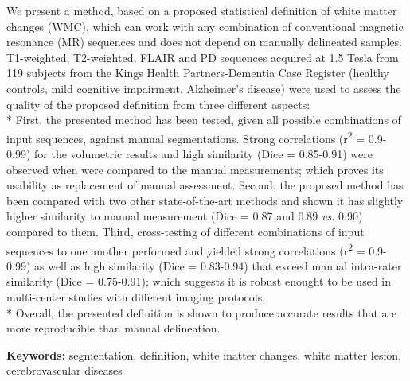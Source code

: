 We present a method, based on a proposed statistical definition of white matter changes (WMC), which can work with any combination of conventional magnetic resonance (MR) sequences and does not depend on manually delineated samples. T1-weighted, T2-weighted, FLAIR and PD sequences acquired at 1.5 Tesla from 119 subjects from the Kings Health Partners-Dementia Case Register (healthy controls, mild cognitive impairment, Alzheimer’s disease) were used to assess the quality of the proposed definition from three different aspects:
\\*
First, the presented method has been tested, given all possible combinations of input sequences, against manual segmentations. Strong correlations (r\textsuperscript{2} = 0.9-0.99) for the volumetric results and high similarity (Dice = 0.85-0.91) were observed when were compared to the manual measurements; which proves its usability as replacement of manual assessment.
Second, the proposed method has been compared with two other state-of-the-art methods and shown it has slightly higher similarity to manual measurement (Dice = 0.87 and 0.89 \textit{vs.} 0.90) compared to them.
Third, cross-testing of different combinations of input sequences to one another performed and yielded strong correlations (r\textsuperscript{2} = 0.9-0.99) as well as high similarity (Dice = 0.83-0.94) that exceed manual intra-rater similarity (Dice = 0.75-0.91); which suggests it is robust enought to be used in multi-center studies with different imaging protocols.
\\*
Overall, the presented definition is shown to produce accurate results that are more reproducible than manual delineation.

\textbf{Keywords:} segmentation, definition, white matter changes, white matter lesion, cerebrovascular diseases

  
  
  
  
  
  
  
  